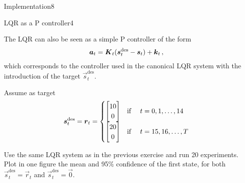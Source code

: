 \begin{questions}
\begin{question}{Implementation}{8}
\begin{answer}\end{answer}


\end{question}


\begin{question}{LQR as a P controller}{4}

	The LQR can also be seen as a simple P controller of the form
	\begin{align}
		\vec a_t = \mat K_t (\vec s^\text{des}_t - \vec s_t) + \vec k_t\,,
	\end{align}
	which corresponds to the controller used in the canonical LQR system with the introduction of the target $\vec s^\text{des}_t$.
	
	Assume as target 
	\begin{align}
        \vec s^\text{des}_t = \vec r_t = \begin{cases}
        \begin{bmatrix}
        10\\
        0
        \end{bmatrix}  & \text{if \quad} t=0,1,\ldots,14
        \\
        \begin{bmatrix}
        20\\
        0
        \end{bmatrix}  & \text{if \quad} t=15,16,\ldots,T
        \end{cases}	
	\end{align}
    
    Use the same LQR system as in the previous exercise and run 20 experiments. Plot in one figure the mean and 95\% confidence of the first state, for both $\vec s^\text{des}_t = \vec r_t$ and $\vec s^\text{des}_t = \vec 0$.

\begin{answer}\end{answer}
\end{question}

	

\end{questions}

